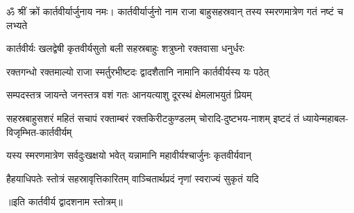 

ॐ श्रीं क्रों कार्तवीर्यार्जुनाय नमः।
\twolineshloka
{कार्तवीर्यार्जुनो नाम राजा बाहुसहस्रवान्}
{तस्य स्मरणमात्रेण गतं नष्टं च लभ्यते}%

\twolineshloka
{कार्तवीर्यः खलद्वेषी कृतवीर्यसुतो बली}
{सहस्रबाहुः शत्रुघ्नो रक्तवासा धनुर्धरः}%

\twolineshloka
{रक्तगन्धो रक्तमाल्यो राजा स्मर्तुरभीष्टदः}
{द्वादशैतानि नामानि कार्तवीर्यस्य यः पठेत्}%

\twolineshloka
{सम्पदस्तत्र जायन्ते जनस्तत्र वशं गतः}
{आनयत्याशु दूरस्थं क्षेमलाभयुतं प्रियम्}%

\fourlineindentedshloka
{सहस्रबाहुसशरं महितं सचापं}
{रक्ताम्बरं रक्तकिरीटकुण्डलम्}
{चोरादि-दुष्टभय-नाशम् इष्टदं तं}
{ध्यायेन्महाबल-विजृम्भित-कार्तवीर्यम्}%

\twolineshloka
{यस्य स्मरणमात्रेण सर्वदुःखक्षयो भवेत्}
{यन्नामानि महावीर्यश्चार्जुनः कृतवीर्यवान्}%

\twolineshloka
{हैहयाधिपतेः स्तोत्रं सहस्रावृत्तिकारितम्}
{वाञ्चितार्थप्रदं नृणां स्वराज्यं सुकृतं यदि}%

॥इति कार्तवीर्य द्वादशनाम स्तोत्रम्॥